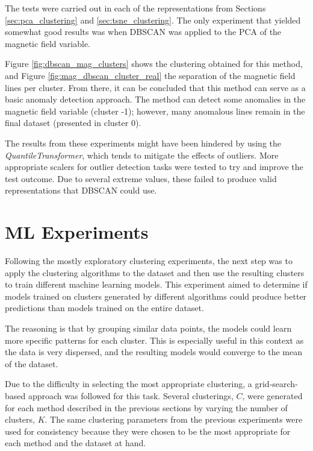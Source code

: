 The tests were carried out in each of the representations from Sections \ref{sec:pca_clustering} and \ref{sec:tsne_clustering}. The only experiment that yielded somewhat good results was when DBSCAN was applied to the PCA of the magnetic field variable. 

Figure \ref{fig:dbscan_mag_clusters} shows the clustering obtained for this method, and Figure \ref{fig:mag_dbscan_cluster_real} the separation of the magnetic field lines per cluster. From there, it can be concluded that this method can serve as a basic anomaly detection approach. The method can detect some anomalies in the magnetic field variable (cluster -1); however, many anomalous lines remain in the final dataset (presented in cluster 0).

The results from these experiments might have been hindered by using the \textit{QuantileTransformer}, which tends to mitigate the effects of outliers. More appropriate scalers for outlier detection tasks were tested to try and improve the test outcome. Due to several extreme values, these failed to produce valid representations that DBSCAN could use.

\section{ML Experiments}\label{sec:clustering_ml_experiments}
Following the mostly exploratory clustering experiments, the next step was to apply the clustering algorithms to the dataset and then use the resulting clusters to train different machine learning models. This experiment aimed to determine if models trained on clusters generated by different algorithms could produce better predictions than models trained on the entire dataset. 

The reasoning is that by grouping similar data points, the models could learn more specific patterns for each cluster. This is especially useful in this context as the data is very dispersed, and the resulting models would converge to the mean of the dataset. %

Due to the difficulty in selecting the most appropriate clustering, a grid-search-based approach was followed for this task. Several clusterings, $C$, were generated for each method described in the previous sections by varying the number of clusters, $K$. The same clustering parameters from the previous experiments were used for consistency because they were chosen to be the most appropriate for each method and the dataset at hand.

